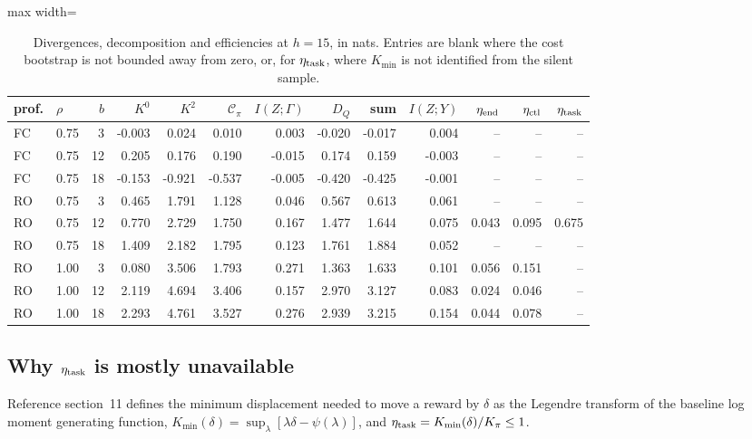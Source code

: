 \documentclass[11pt]{article}
\begin{document}
\begin{table}[htbp]\centering\small
\caption{Divergences, decomposition and efficiencies at $h=15$, in nats. Entries are
blank where the cost bootstrap is not bounded away from zero, or, for $\eta_{\rm task}$,
where $K_{\min}$ is not identified from the silent sample.}\label{tab:cost}
\begin{adjustbox}{max width=\textwidth}
\begin{tabular}{llr rrr rrr r rrr}
\toprule
prof. & $\rho$ & $b$ & $K^0$ & $K^2$ & $\mathcal C_\pi$ & $I(Z;\Gamma)$ & $D_Q$ & sum & $I(Z;Y)$ & $\eta_{\rm end}$ & $\eta_{\rm ctl}$ & $\eta_{\rm task}$ \\
\midrule
FC & 0.75 & 3 & -0.003 & 0.024 & 0.010 & 0.003 & -0.020 & -0.017 & 0.004 & -- & -- & -- \\
FC & 0.75 & 12 & 0.205 & 0.176 & 0.190 & -0.015 & 0.174 & 0.159 & -0.003 & -- & -- & -- \\
FC & 0.75 & 18 & -0.153 & -0.921 & -0.537 & -0.005 & -0.420 & -0.425 & -0.001 & -- & -- & -- \\
RO & 0.75 & 3 & 0.465 & 1.791 & 1.128 & 0.046 & 0.567 & 0.613 & 0.061 & -- & -- & -- \\
RO & 0.75 & 12 & 0.770 & 2.729 & 1.750 & 0.167 & 1.477 & 1.644 & 0.075 & 0.043 & 0.095 & 0.675 \\
RO & 0.75 & 18 & 1.409 & 2.182 & 1.795 & 0.123 & 1.761 & 1.884 & 0.052 & -- & -- & -- \\
RO & 1.00 & 3 & 0.080 & 3.506 & 1.793 & 0.271 & 1.363 & 1.633 & 0.101 & 0.056 & 0.151 & -- \\
RO & 1.00 & 12 & 2.119 & 4.694 & 3.406 & 0.157 & 2.970 & 3.127 & 0.083 & 0.024 & 0.046 & -- \\
RO & 1.00 & 18 & 2.293 & 4.761 & 3.527 & 0.276 & 2.939 & 3.215 & 0.154 & 0.044 & 0.078 & -- \\
\bottomrule
\end{tabular}
\end{adjustbox}
\end{table}

\subsection{Why $\eta_{\rm task}$ is mostly unavailable}
Reference section~11 defines the minimum displacement needed to move a reward by $\delta$ as
the Legendre transform of the baseline log moment generating function,
$K_{\min}(\delta)=\sup_\lambda[\lambda\delta-\psi(\lambda)]$, and
$\eta_{\rm task}=K_{\min}(\delta)/K_\pi\le1$.
\end{document}
